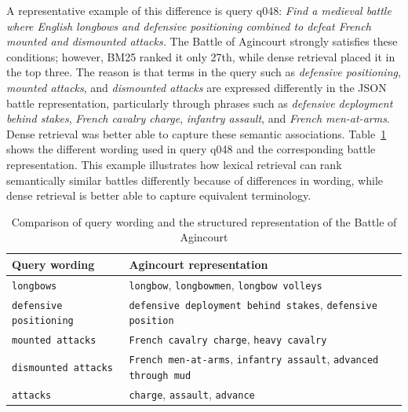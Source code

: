 A representative example of this difference is query q048: \textit{Find a medieval battle where English longbows and defensive positioning combined to defeat French mounted and dismounted attacks.} The Battle of Agincourt strongly satisfies these conditions; however, BM25 ranked it only 27th, while dense retrieval placed it in the top three. The reason is that terms in the query such as \textit{defensive positioning}, \textit{mounted attacks}, and \textit{dismounted attacks} are expressed differently in the JSON battle representation, particularly through phrases such as \textit{defensive deployment behind stakes}, \textit{French cavalry charge}, \textit{infantry assault}, and \textit{French men-at-arms}. Dense retrieval was better able to capture these semantic associations. Table~\ref{tab:agincourt_query_wording} shows the different wording used in query q048 and the corresponding battle representation. This example illustrates how lexical retrieval can rank semantically similar battles differently because of differences in wording, while dense retrieval is better able to capture equivalent terminology.
\begin{table}[htbp]
    \centering
    \caption{Comparison of query wording and the structured representation of the Battle of Agincourt}
    \label{tab:agincourt_query_wording}

    \small
    \renewcommand{\arraystretch}{1.5}
    \setlength{\tabcolsep}{6pt}

    \begin{tabular}{
        >{\raggedright\arraybackslash}p{}
        >{\raggedright\arraybackslash}p{}
    }
        \toprule
        \textbf{Query wording} &
        \textbf{Agincourt representation} \\
        \midrule

        \texttt{longbows} &
        \texttt{longbow}, \texttt{longbowmen},
        \texttt{longbow volleys} \\
        \midrule

        \texttt{defensive positioning} &
        \texttt{defensive deployment behind stakes},
        \texttt{defensive position} \\
        \midrule

        \texttt{mounted attacks} &
        \texttt{French cavalry charge},
        \texttt{heavy cavalry} \\
        \midrule

        \texttt{dismounted attacks} &
        \texttt{French men-at-arms},
        \texttt{infantry assault},
        \texttt{advanced through mud} \\
        \midrule

        \texttt{attacks} &
        \texttt{charge}, \texttt{assault},
        \texttt{advance} \\

        \bottomrule
    \end{tabular}
\end{table}

